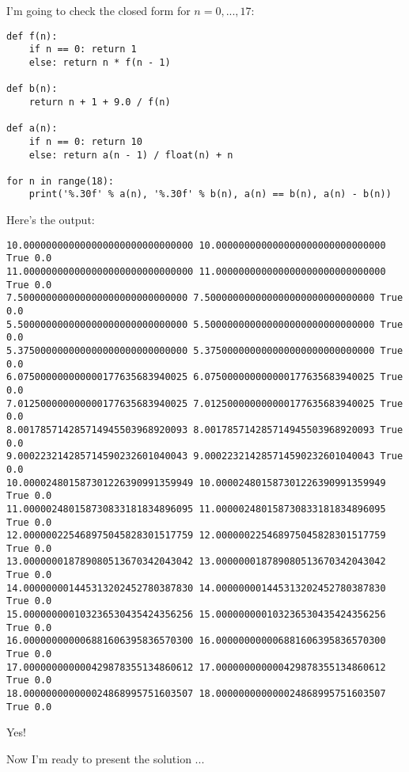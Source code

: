 I'm going to check the closed form for $n = 0, ..., 17$:
\begin{Verbatim}[frame=single, fontsize=\footnotesize]
def f(n):
    if n == 0: return 1
    else: return n * f(n - 1)

def b(n):
    return n + 1 + 9.0 / f(n)

def a(n):
    if n == 0: return 10
    else: return a(n - 1) / float(n) + n

for n in range(18):
    print('%.30f' % a(n), '%.30f' % b(n), a(n) == b(n), a(n) - b(n))
\end{Verbatim}
Here's the output:
\begin{Verbatim}[frame=single, fontsize=\footnotesize]
10.000000000000000000000000000000 10.000000000000000000000000000000 True 0.0
11.000000000000000000000000000000 11.000000000000000000000000000000 True 0.0
7.500000000000000000000000000000 7.500000000000000000000000000000 True 0.0
5.500000000000000000000000000000 5.500000000000000000000000000000 True 0.0
5.375000000000000000000000000000 5.375000000000000000000000000000 True 0.0
6.075000000000000177635683940025 6.075000000000000177635683940025 True 0.0
7.012500000000000177635683940025 7.012500000000000177635683940025 True 0.0
8.001785714285714945503968920093 8.001785714285714945503968920093 True 0.0
9.000223214285714590232601040043 9.000223214285714590232601040043 True 0.0
10.000024801587301226390991359949 10.000024801587301226390991359949 True 0.0
11.000002480158730833181834896095 11.000002480158730833181834896095 True 0.0
12.000000225468975045828301517759 12.000000225468975045828301517759 True 0.0
13.000000018789080513670342043042 13.000000018789080513670342043042 True 0.0
14.000000001445313202452780387830 14.000000001445313202452780387830 True 0.0
15.000000000103236530435424356256 15.000000000103236530435424356256 True 0.0
16.000000000006881606395836570300 16.000000000006881606395836570300 True 0.0
17.000000000000429878355134860612 17.000000000000429878355134860612 True 0.0
18.000000000000024868995751603507 18.000000000000024868995751603507 True 0.0
\end{Verbatim}

Yes!

Now I'm ready to present the solution ...

\newpage
\SOLUTION

